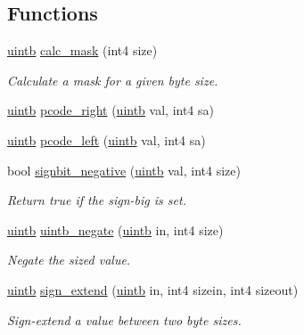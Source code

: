 \subsection*{Functions}
\begin{DoxyCompactItemize}
\item 
\mbox{\hyperlink{types_8h_a2db313c5d32a12b01d26ac9b3bca178f}{uintb}} \mbox{\hyperlink{address_8hh_aae7b27e228c11138200b27f02831fc00}{calc\+\_\+mask}} (int4 size)
\begin{DoxyCompactList}\small\item\em Calculate a mask for a given byte size. \end{DoxyCompactList}\item 
\mbox{\hyperlink{types_8h_a2db313c5d32a12b01d26ac9b3bca178f}{uintb}} \mbox{\hyperlink{address_8hh_ac12878da77772a55518155dd325ede11}{pcode\+\_\+right}} (\mbox{\hyperlink{types_8h_a2db313c5d32a12b01d26ac9b3bca178f}{uintb}} val, int4 sa)
\item 
\mbox{\hyperlink{types_8h_a2db313c5d32a12b01d26ac9b3bca178f}{uintb}} \mbox{\hyperlink{address_8hh_af93e26c16ad497e986e09aedde194a93}{pcode\+\_\+left}} (\mbox{\hyperlink{types_8h_a2db313c5d32a12b01d26ac9b3bca178f}{uintb}} val, int4 sa)
\item 
bool \mbox{\hyperlink{address_8hh_a78af4f83feb5be82e1cb2f6743792ba4}{signbit\+\_\+negative}} (\mbox{\hyperlink{types_8h_a2db313c5d32a12b01d26ac9b3bca178f}{uintb}} val, int4 size)
\begin{DoxyCompactList}\small\item\em Return true if the sign-\/big is set. \end{DoxyCompactList}\item 
\mbox{\hyperlink{types_8h_a2db313c5d32a12b01d26ac9b3bca178f}{uintb}} \mbox{\hyperlink{address_8hh_a78cde28c4eada28e12fe0dbdfb840753}{uintb\+\_\+negate}} (\mbox{\hyperlink{types_8h_a2db313c5d32a12b01d26ac9b3bca178f}{uintb}} in, int4 size)
\begin{DoxyCompactList}\small\item\em Negate the {\itshape sized} value. \end{DoxyCompactList}\item 
\mbox{\hyperlink{types_8h_a2db313c5d32a12b01d26ac9b3bca178f}{uintb}} \mbox{\hyperlink{address_8hh_a6f16b447a8d8851178b1f0709c14bde6}{sign\+\_\+extend}} (\mbox{\hyperlink{types_8h_a2db313c5d32a12b01d26ac9b3bca178f}{uintb}} in, int4 sizein, int4 sizeout)
\begin{DoxyCompactList}\small\item\em Sign-\/extend a value between two byte sizes. \end{DoxyCompactList}\item 

\end{DoxyCompactItemize}
